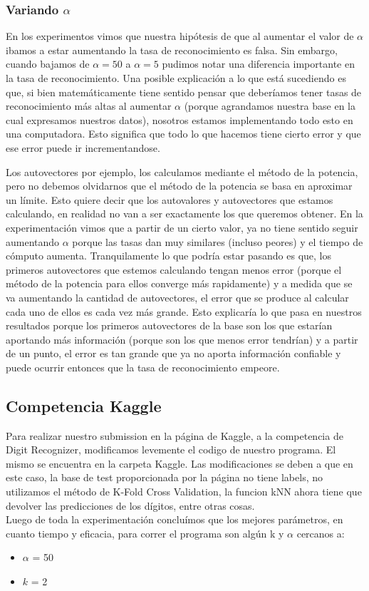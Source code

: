 \subsubsection{Variando $\alpha$}
En los experimentos vimos que nuestra hipótesis de que al aumentar el valor de $\alpha$ ibamos a estar aumentando la tasa de reconocimiento es falsa. Sin embargo, cuando bajamos de $\alpha = 50$ a $\alpha = 5$ pudimos notar una diferencia importante en la tasa de reconocimiento. Una posible explicación a lo que está sucediendo es que, si bien matemáticamente tiene sentido pensar que deberíamos tener tasas de reconocimiento más altas al aumentar $\alpha$ (porque agrandamos nuestra base en la cual expresamos nuestros datos), nosotros estamos implementando todo esto en una computadora. Esto significa que todo lo que hacemos tiene cierto error y que ese error puede ir incrementandose. 
\par Los autovectores por ejemplo, los calculamos mediante el método de la potencia, pero no debemos olvidarnos que el método de la potencia se basa en aproximar un límite. Esto quiere decir que los autovalores y autovectores que estamos calculando, en realidad no van a ser exactamente los que queremos obtener. En la experimentación vimos que a partir de un cierto valor, ya no tiene sentido seguir aumentando $\alpha$ porque las tasas dan muy similares (incluso peores) y el tiempo de cómputo aumenta. Tranquilamente lo que podría estar pasando es que, los primeros autovectores que estemos calculando tengan menos error (porque el método de la potencia para ellos converge más rapidamente) y a medida que se va aumentando la cantidad de autovectores, el error que se produce al calcular cada uno de ellos es cada vez más grande. Esto explicaría lo que pasa en nuestros resultados porque los primeros autovectores de la base son los que estarían aportando más información (porque son los que menos error tendrían) y a partir de un punto, el error es tan grande que ya no aporta información confiable y puede ocurrir entonces que la tasa de reconocimiento empeore.



\subsection{Competencia Kaggle}
Para realizar nuestro submission en la página de Kaggle, a la competencia de Digit Recognizer, modificamos levemente el codigo de nuestro programa. El mismo se encuentra en la carpeta Kaggle. Las modificaciones se deben a que en este caso, la base de test proporcionada por la página no tiene labels, no utilizamos el método de K-Fold Cross Validation, la funcion kNN ahora tiene que devolver las predicciones de los dígitos, entre otras cosas.\\
Luego de toda la experimentación concluímos que los mejores parámetros, en cuanto tiempo y eficacia, para correr el programa son algún k y $\alpha$ cercanos a:
\begin{itemize}
\item $\alpha$ = 50
\item $k$ = 2
\end{itemize}

